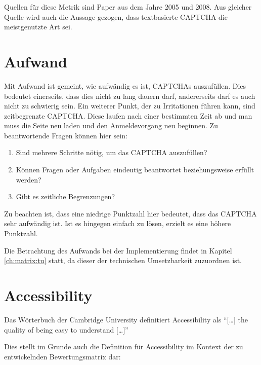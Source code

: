 Quellen für diese Metrik sind Paper aus dem Jahre 2005 und 2008.
Aus gleicher Quelle wird auch die Aussage gezogen, dass textbasierte CAPTCHA die meistgenutzte Art sei.


\section{Aufwand}
\label{ch:matrix:aufwand}
Mit Aufwand ist gemeint, wie aufwändig es ist, CAPTCHAs auszufüllen. 
Dies bedeutet einerseits, dass dies nicht zu lang dauern darf, andererseits darf es auch nicht zu schwierig sein. %
Ein weiterer Punkt, der zu Irritationen führen kann, sind zeitbegrenzte CAPTCHA. 
Diese laufen nach einer bestimmten Zeit ab und man muss die Seite neu laden und den Anmeldevorgang neu beginnen.
Zu beantwortende Fragen können hier sein:
\begin{enumerate}
    \item Sind mehrere Schritte nötig, um das CAPTCHA auszufüllen?
    \item Können Fragen oder Aufgaben eindeutig beantwortet beziehungsweise erfüllt werden?
    \item Gibt es zeitliche Begrenzungen?
\end{enumerate}
Zu beachten ist, dass eine niedrige Punktzahl hier bedeutet, dass das CAPTCHA sehr aufwändig ist.
Ist es hingegen einfach zu lösen, erzielt es eine höhere Punktzahl.

Die Betrachtung des Aufwands bei der Implementierung findet in Kapitel \ref{ch:matrix:tu} statt, da dieser der technischen Umsetzbarkeit zuzuordnen ist. 

\section{Accessibility}
\label{ch:matrix:accessibility}
Das Wörterbuch der Cambridge University definitiert Accessibility als ``$[$\dots$]$ the quality of being easy to understand $[$\dots$]$'' \cite{CACD:2008}

Dies stellt im Grunde auch die Definition für Accessibility im Kontext der zu entwickelnden Bewertungsmatrix dar:

